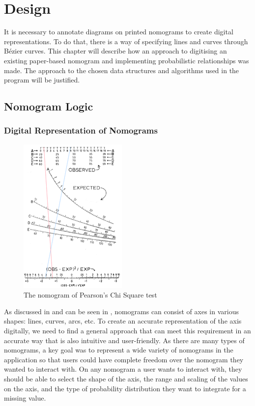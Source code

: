 \documentclass{l4proj}
\begin{document}
\chapter{Design}\label{design}

It is necessary to annotate diagrams on printed nomograms to create digital representations. To do that, there is a way of specifying lines and curves through Bézier curves. This chapter will describe how an approach to digitising an existing paper-based nomogram and implementing probabilistic relationships was made. The approach to the chosen data structures and algorithms used in the program will be justified. 

\section{Nomogram Logic}\label{nomo-logic}


\subsection{Digital Representation of Nomograms }

\begin{figure}[H]
    \centering
    \includegraphics[width=0.25\linewidth]{dissertation//images//myFigures//design/200px-Chisquarenomo3.png}
    \caption{The nomogram of Pearson's Chi Square test \citep{boyd_nomogram_1965}}
    \label{fig:chi-square}
\end{figure}


As discussed in  and can be seen in  , nomograms can consist of axes in various shapes: lines, curves, arcs, etc. To create an accurate representation of the axis digitally, we need to find a general approach that can meet this requirement in an accurate way that is also intuitive and user-friendly. As there are many types of nomograms, a key goal was to represent a wide variety of nomograms in the application so that users could have complete freedom over the nomogram they wanted to interact with. On any nomogram a user wants to interact with, they should be able to select the shape of the axis, the range and scaling of the values on the axis, and the type of probability distribution they want to integrate for a missing value. 
\end{document}
